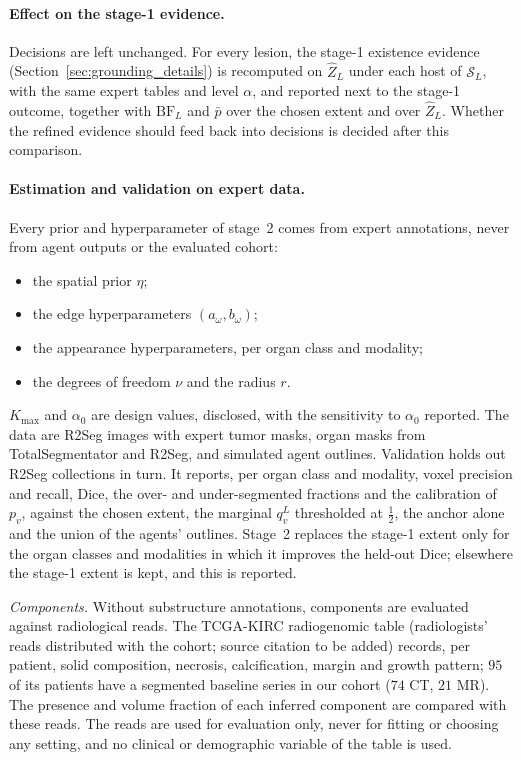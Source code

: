 \documentclass[fleqn,10pt]{olplainarticle}
\begin{document}
\paragraph{Effect on the stage-1 evidence.} Decisions are left unchanged. For every lesion, the stage-1 existence evidence
(Section~\ref{sec:grounding_details}) is recomputed on $\hat Z_L$ under each host of $\mathcal{S}_L$, with the same expert
tables and level $\alpha$, and reported next to the stage-1 outcome, together with $\mathrm{BF}_L$ and $\bar p$ over the
chosen extent and over $\hat Z_L$. Whether the refined evidence should feed back into decisions is decided after this
comparison.

\paragraph{Estimation and validation on expert data.} Every prior and hyperparameter of stage~2 comes from expert
annotations, never from agent outputs or the evaluated cohort:
\begin{itemize}
\item the spatial prior $\eta$;
\item the edge hyperparameters $(a_\omega,b_\omega)$;
\item the appearance hyperparameters, per organ class and modality;
\item the degrees of freedom $\nu$ and the radius $r$.
\end{itemize}
$K_{\max}$ and $\alpha_0$ are design values, disclosed, with the sensitivity to $\alpha_0$ reported. The data are R2Seg images
with expert tumor masks, organ masks from TotalSegmentator and R2Seg, and simulated agent outlines. Validation holds out
R2Seg collections in turn. It reports, per organ class and modality, voxel precision and recall, Dice, the over- and
under-segmented fractions and the calibration of $p_v$, against the chosen extent, the marginal $q^L_v$ thresholded at
$\tfrac12$, the anchor alone and the union of the agents' outlines. Stage~2 replaces the stage-1 extent only for the organ
classes and modalities in which it improves the held-out Dice; elsewhere the stage-1 extent is kept, and this is reported.

\emph{Components.} Without substructure annotations, components are evaluated against radiological reads. The TCGA-KIRC
radiogenomic table (radiologists' reads distributed with the cohort; source citation to be added) records, per patient, solid composition, necrosis, calcification,
margin and growth pattern; $95$ of its patients have a segmented baseline series in our cohort ($74$ CT, $21$ MR). The
presence and volume fraction of each inferred component are compared with these reads. The reads are used for evaluation
only, never for fitting or choosing any setting, and no clinical or demographic variable of the table is used.
\end{document}
